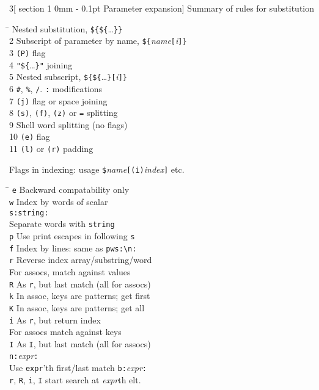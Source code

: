 \documentclass{article}
\makeatletter
\renewcommand{\section}{\@startsection
  {section}%
  {1}%
  {0mm}%
  {-\baselineskip}%
  {0.1pt}%
  {\normalfont\normalsize\scshape}} %
\newcommand\I[1]{\textsl{#1}}
\newcommand\T[1]{\texttt{#1}}
\makeatother
\begin{document}
\begin{multicols}{3}[\section{Parameter expansion}]
Summary of rules for substitution
\begin{tabbing}
\hskip 20pt \=               \> Nested substitution, \verb!${${!\dots\verb!}}! \\
2              \> Subscript of parameter by name,
\verb!${!\I{name}\verb![!\I{i}\verb!]}! \\
3              \> \verb!(P)! flag \\
4              \> \verb!"${!\dots\verb!}"! joining \\
5              \> Nested subscript, \verb!${${!\dots\verb!}[!\I{i}\verb!]}! \\
6              \> \verb!#!, \verb!%!, \verb!/!. \verb!:! modifications \\
7              \> \verb!(j)! flag or space joining \\
8              \> \verb!(s)!, \verb!(f)!, \verb!(z)! or \verb!=! splitting \\
9              \> Shell word splitting (no flags) \\
10             \> \verb!(e)! flag \\
11             \> \verb!(l)! or \verb!(r)! padding \\
\end{tabbing}

Flags in indexing: usage \verb!$!\I{name}\verb![(i)!\I{index}\verb!]! etc.
\begin{tabbing}
\hskip 20pt \= \kill
\T{e}           \> Backward compatability only \\
\T{w}           \> Index by words of scalar \\
\T{s:string:} \\
                \> Separate words with \T{string} \\
\T{p}           \> Use print escapes in following \T{s} \\
\T{f}           \> Index by lines: same as \verb!pws:\n:! \\
\T{r}           \> Reverse index array/substring/word \\
                \> For assocs, match against values \\
\T{R}           \> As \T{r}, but last match (all for assocs) \\
\T{k}           \> In assoc, keys are patterns; get first \\
\T{K}           \> In assoc, keys are patterns; get all \\
\T{i}           \> As \T{r}, but return index \\
                \> For assocs match against keys \\
\T{I}           \> As \T{I}, but last match (all for assocs) \\
\verb!n:!\I{expr}\verb!:! \\
                \> Use \T{expr}'th first/last match
\verb!b:!\I{expr}\verb!:! \\
                \> \T{r}, \T{R}, \T{i}, \T{I} start search at \I{expr}th elt.
\end{tabbing}
\end{multicols}
\end{document}
